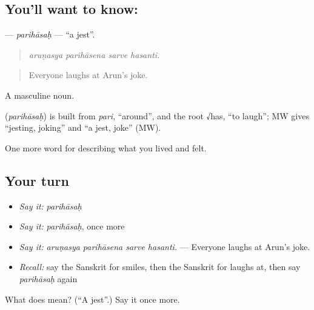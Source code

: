 \subsection*{You'll want to know: }
\textbf{} — \emph{parihāsaḥ} — \textquotedblleft{}a jest\textquotedblright{}.

\begin{quote}
   
\end{quote}

\begin{quote}
\emph{aruṇasya parihāsena sarve hasanti.}
\end{quote}

\begin{quote}
Everyone laughs at Arun's joke.
\end{quote}

A masculine noun.

\begin{cousinweb}
\textbf{} (\emph{parihāsaḥ}) is built from \emph{pari}, \textquotedblleft{}around\textquotedblright{}, and the root √has, \textquotedblleft{}to laugh\textquotedblright{}; MW gives \textquotedblleft{}jesting, joking\textquotedblright{} and \textquotedblleft{}a jest, joke\textquotedblright{} (MW).
\end{cousinweb}

\begin{grammarlens}[title={What you've built}]
One more word for describing what you lived and felt.
\end{grammarlens}

\subsection*{Your turn}
\begin{itemize}
\raggedright
  \item \emph{Say it:} \emph{parihāsaḥ}
  \item \emph{Say it:} \emph{parihāsaḥ}, once more
  \item \emph{Say it:} \emph{aruṇasya parihāsena sarve hasanti.} — Everyone laughs at Arun's joke.
  \item \emph{Recall:} say the Sanskrit for smiles, then the Sanskrit for laughs at, then say \emph{parihāsaḥ} again
\end{itemize}

\begin{tcolorbox}[breakable,colback=teal!4,colframe=teal!35!black,title={Before you move on}]
What does  mean? (\textquotedblleft{}A jest\textquotedblright{}.) Say it once more.
\end{tcolorbox}
